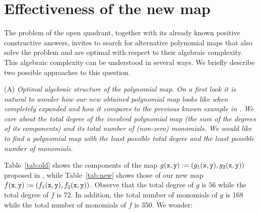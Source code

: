 \documentclass[1p]{elsarticle}
\newcommand{\x}{{\tt x}} \newcommand{\y}{{\tt y}}
\begin{document}
\section{Effectiveness of the new map}\label{sec:effect}

The problem of the open quadrant, together with its already known positive constructive answers, invites to search for alternative polynomial maps that also solve the problem and are optimal with respect to their algebraic complexity. This algebraic complexity can be understood in several ways. We briefly describe two possible approaches to this question.

\noindent 
(A) \em Optimal algebraic structure of the polynomial map\em. On a first look it is natural to wonder how our new obtained polynomial map looks like when completely expanded and how it compares to the previous known example in \citet{fg1}. We care about the total degree of the involved polynomial map (the sum of the degrees of its components) and its total number of (non-zero) monomials. We would like to find a polynomial map with the least possible total degree and the least possible number of monomials.

{Table}~\ref{tab:old} shows the components of the map $g(\x,\y):=(g_1(\x,\y),g_2(\x,\y))$ proposed in \citet{fg1}, 
while {Table}~\ref{tab:new} shows those of our new map $f(\x,\y):=(f_1(\x,\y),f_2(\x,\y))$. 
Observe that the total degree of $g$ is $56$ while the total degree of $f$ is $72$. 
In addition, the total number of monomials of $g$ is $168$ while the total number of monomials of $f$ is $350$. We wonder:
\end{document}
